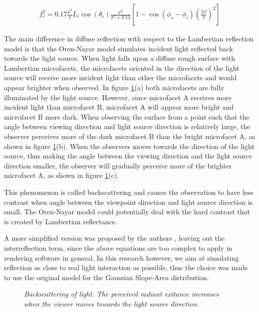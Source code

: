 	\begin{eqnarray*}
		f_r^2 = 0.17\frac{\rho^2}{\pi}L_i\cos(\theta_i)\frac{\sigma^2}{\sigma^2+0.13}\left[1-\cos(\phi_r-\phi_i)\left( \frac{2\beta}{\pi} \right)^2 \right]
	\end{eqnarray*}

The main difference in diffuse reflection with respect to the Lambertian reflection model is that the Oren-Nayar model simulates incident light reflected back towards the light source. When light falls upon a diffuse rough surface with Lambertian microfacets, the microfacets oriented in the direction of the light source will receive more incident light than other the microfacets and would appear brighter when observed. In figure \ref{fig:Backscatter}(a) both microfacets are fully illuminated by the light source. However, since microfacet A receives more incident light than microfacet B, microfacet A will appear more bright and microfacet B more dark. When observing the surface from a point such that the angle between viewing direction and light source direction is relatively large, the observer perceives more of the dark microfacet B than the bright microfacet A, as shown in figure \ref{fig:Backscatter}(b). When the observers moves towards the direction of the light source, thus making the angle between the viewing direction and the light source direction smaller, the observer will gradually perceive more of the brighter microfacet A, as shown in figure \ref{fig:Backscatter}(c).


This phenomenon is called backscattering and causes the observation to have less contrast when angle between the viewpoint direction and light source direction is small. The Oren-Nayar model could potentially deal with the hard contrast that is created by Lambertian reflectance.

A more simplified version was proposed by the authors \cite{OrenNayar}, leaving out the interreflection term, since the above equations are too complex to apply in rendering software in general. In this research however, we aim at simulating reflection as close to real light interaction as possible, thus the choice was made to use the original model for the Gaussian Slope-Area distribution.

\begin{figure}[ht]
	\begin{center}

	\end{center}
	\caption{{\it Backscattering of light. The perceived radiant exitance increases when the viewer moves towards the light source direction.}}
	\label{fig:Backscatter}
\end{figure}


